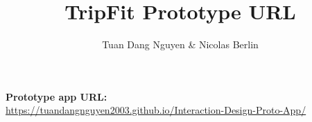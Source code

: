 \documentclass[11pt,a4paper]{article}
\title{TripFit Prototype URL}
\author{Tuan Dang Nguyen \& Nicolas Berlin}
\date{}
\begin{document}
\maketitle

\textbf{Prototype app URL:}\\
\url{https://tuandangnguyen2003.github.io/Interaction-Design-Proto-App/}
\end{document}
